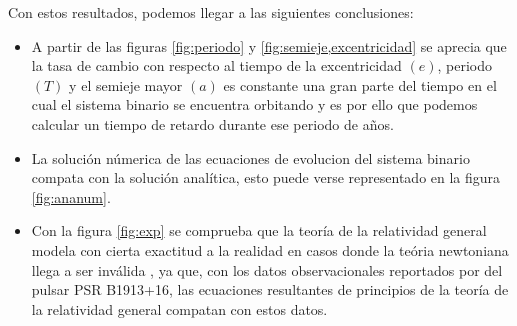Con estos resultados, podemos llegar a las siguientes conclusiones:
\begin{itemize}
    \item A partir de las figuras \ref{fig:periodo} y \ref{fig:semieje,excentricidad} se aprecia que la tasa de cambio 
    con respecto al tiempo de la excentricidad $(e)$, periodo $(T)$ y el semieje mayor $(a)$ es constante una gran parte del 
    tiempo en el cual el sistema binario se encuentra orbitando y es por ello que podemos calcular un tiempo de retardo durante ese periodo de años.
    \item La solución númerica de las ecuaciones de evolucion del sistema binario compata con la solución analítica, esto puede verse representado
    en la figura \ref{fig:ananum}.
    \item Con la figura \ref{fig:exp} se comprueba que la teoría de la relatividad general modela con cierta exactitud a la realidad en casos donde la teória newtoniana llega a ser inválida
    , ya que, con los datos observacionales reportados por \cite{Weisberg2010} del pulsar PSR B1913+16, las ecuaciones resultantes de principios de la teoría de la relatividad general compatan con estos datos.
\end{itemize}